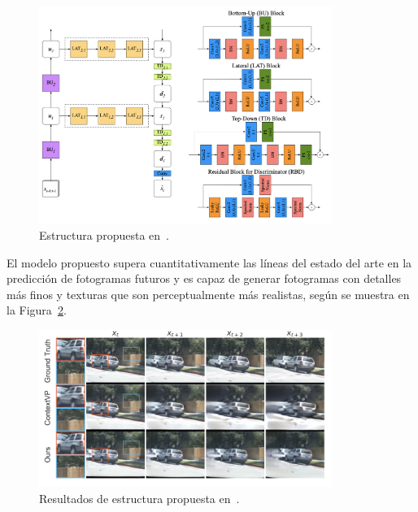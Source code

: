 \vspace{10pt}
\begin{figure}[H]
	\begin{center}
		\includegraphics[width=0.85\textwidth]{ figures/estadoarte/Real-net.png}
		\caption{Estructura propuesta en~\cite{photorealistic}.}
		\label{fig.real-net}
	\end{center}
\end{figure}
\vspace{-10pt}

El modelo propuesto supera cuantitativamente las líneas del estado del arte en la predicción de fotogramas futuros y es capaz de generar fotogramas con detalles más finos y texturas que son perceptualmente más realistas, según se muestra en la Figura~\ref{fig.real-func}.

\vspace{10pt}
\begin{figure}[H]
	\begin{center}
		\includegraphics[width=0.85\textwidth]{ figures/estadoarte/Real-func.png}
		\caption{Resultados de estructura propuesta en~\cite{photorealistic}.}
		\label{fig.real-func}
	\end{center}
\end{figure}
\vspace{-10pt}


